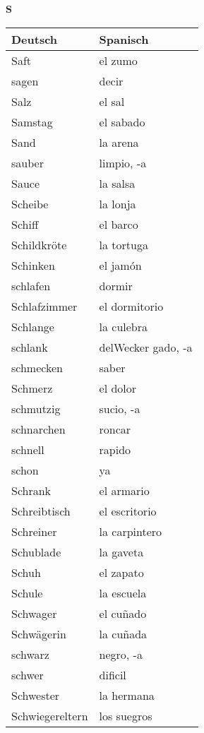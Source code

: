 \begin{flushright}\begin{Huge}\textbf{S}\end{Huge}\end{flushright}

\begin{longtable}{p{} p{}} 
\textbf{Deutsch}     & \textbf{Spanisch}                                       \\ \hline
\hline
\endhead %
Saft & el zumo\\
sagen & decir \\
Salz & el sal\\
Samstag & el sabado\\
Sand & la arena\\
sauber & limpio, -a\\
Sauce & la salsa\\
Scheibe & la lonja\\
Schiff & el barco\\
Schildkröte & la tortuga\\
Schinken & el jamón\\
schlafen & dormir\\
Schlafzimmer & el dormitorio\\
Schlange & la culebra\\
schlank & delWecker
gado, -a\\
schmecken & saber\\
Schmerz & el dolor\\
schmutzig & sucio, -a\\
schnarchen & roncar\\
schnell & rapido\\
schon & ya\\
Schrank & el armario\\
Schreibtisch & el escritorio\\
Schreiner & la carpintero\\
Schublade & la gaveta\\
Schuh & el zapato\\
Schule & la escuela\\
Schwager & el cuñado\\
Schwägerin & la cuñada\\
schwarz & negro, -a\\
schwer & dificil\\
Schwester & la hermana\\
Schwiegereltern & los suegros\\

\end{longtable}
